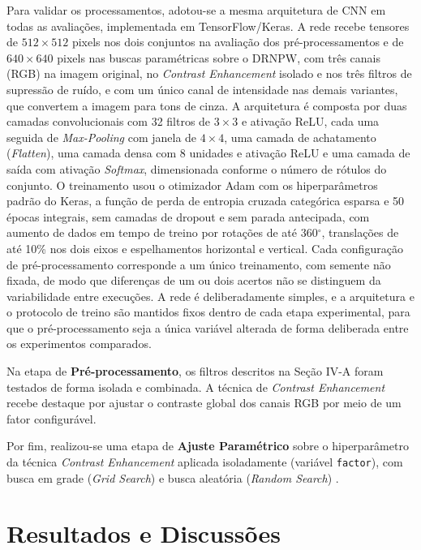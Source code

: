 \documentclass[conference]{IEEEtran}
\begin{document}
Para validar os processamentos, adotou-se a mesma arquitetura de CNN em todas as avaliações, implementada em TensorFlow/Keras. A rede recebe tensores de $512 \times 512$ pixels nos dois conjuntos na avaliação dos pré-processamentos e de $640 \times 640$ pixels nas buscas paramétricas sobre o DRNPW, com três canais (RGB) na imagem original, no \textit{Contrast Enhancement} isolado e nos três filtros de supressão de ruído, e com um único canal de intensidade nas demais variantes, que convertem a imagem para tons de cinza. A arquitetura é composta por duas camadas convolucionais com 32 filtros de $3 \times 3$ e ativação ReLU, cada uma seguida de \textit{Max-Pooling} com janela de $4 \times 4$, uma camada de achatamento (\textit{Flatten}), uma camada densa com 8 unidades e ativação ReLU e uma camada de saída com ativação \textit{Softmax}, dimensionada conforme o número de rótulos do conjunto. O treinamento usou o otimizador Adam com os hiperparâmetros padrão do Keras, a função de perda de entropia cruzada categórica esparsa e 50 épocas integrais, sem camadas de dropout e sem parada antecipada, com aumento de dados em tempo de treino por rotações de até 360$^\circ$, translações de até 10\% nos dois eixos e espelhamentos horizontal e vertical. Cada configuração de pré-processamento corresponde a um único treinamento, com semente não fixada, de modo que diferenças de um ou dois acertos não se distinguem da variabilidade entre execuções. A rede é deliberadamente simples, e a arquitetura e o protocolo de treino são mantidos fixos dentro de cada etapa experimental, para que o pré-processamento seja a única variável alterada de forma deliberada entre os experimentos comparados.

Na etapa de \textbf{Pré-processamento}, os filtros descritos na Seção IV-A foram testados de forma isolada e combinada. A técnica de \textit{Contrast Enhancement} recebe destaque por ajustar o contraste global dos canais RGB por meio de um fator configurável.

Por fim, realizou-se uma etapa de \textbf{Ajuste Paramétrico} sobre o hiperparâmetro da técnica \textit{Contrast Enhancement} aplicada isoladamente (variável \texttt{factor}), com busca em grade (\textit{Grid Search}) e busca aleatória (\textit{Random Search}) \cite{yang2020hyperparameter}.

\section{Resultados e Discussões}
\end{document}
